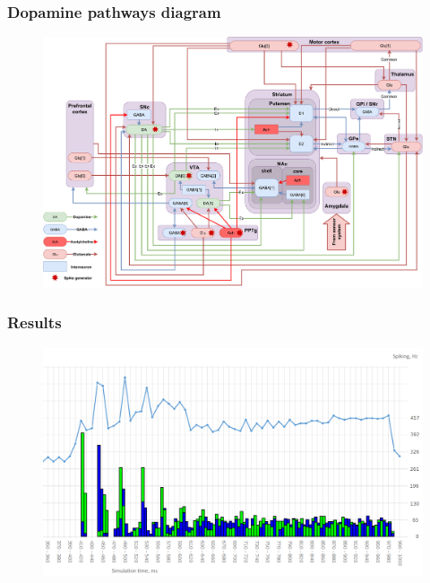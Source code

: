 \documentclass[12pt, aspectratio=169]{beamer}
\begin{document}
\begin{frame}
\frametitle{Dopamine pathways diagram}
\begin{figure}
\includegraphics[width=0.8\linewidth]{dopamine_diagram}
\end{figure}
\end{frame}



\begin{frame}
\frametitle{Results}
\begin{figure}
\includegraphics[width=0.8\linewidth]{resultBIG_short}
\end{figure}
\end{frame}


\end{document}
